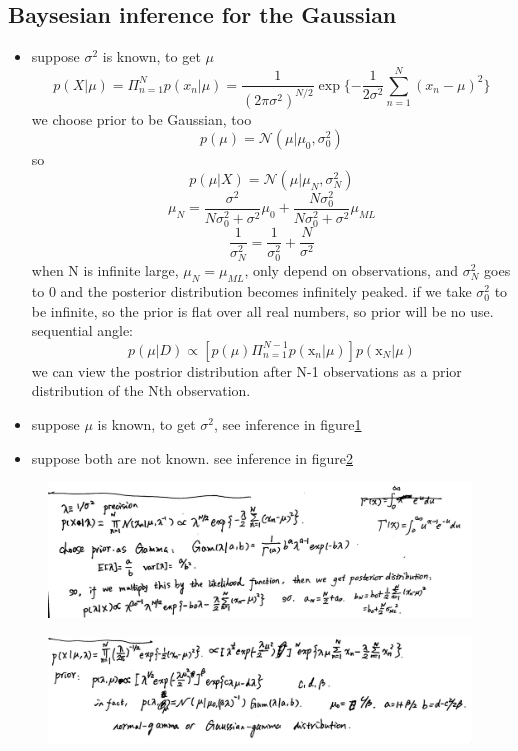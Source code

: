 \documentclass[a4paper]{book}
\begin{document}
\subsection{Baysesian inference for the Gaussian}
\begin{itemize}
  \item suppose $\sigma^2$ is known, to get $\mu$
  $$p(X|\mu) = \Pi_{n=1}^Np(x_n|\mu) = \frac1{(2\pi\sigma^2)^{N/2}}\exp\{-\frac1{2\sigma^2}\sum_{n=1}^N(x_n-\mu)^2\}$$
  we choose prior to be Gaussian, too
  $$p(\mu)= \mathcal N(\mu|\mu_0,\sigma_0^2) $$
so $$p(\mu|X) = \mathcal N(\mu|\mu_N,\sigma_N^2)$$
$$\mu_N  = \frac{\sigma^2}{N\sigma_0^2+\sigma^2}\mu_0+\frac{N\sigma_0^2}{N\sigma_0^2+\sigma^2}\mu_{ML}$$
$$\frac1{\sigma_N^2} = \frac1{\sigma_0^2}+\frac N{\sigma^2}$$
when N is infinite large, $\mu_N = \mu_{ML}$, only depend on observations, and $\sigma_N^2$ goes to 0 and the posterior distribution becomes infinitely peaked.\newline
if we take $\sigma_0^2$ to be infinite, so the prior is flat over all real numbers, so prior will be no use.\newline
sequential angle:
$$p(\mu|D)\propto [p(\mu)\Pi_{n=1}^{N-1}p(\mathrm x_n|\mu)]p(\mathrm x_N|\mu)$$
we can view the postrior distribution after N-1 observations as a prior distribution of the Nth observation.
  \item suppose $\mu$ is known, to get $\sigma^2$, see inference in figure\ref{fig1.2}
  \item suppose both are not known. see inference in figure\ref{fig1.3}
\end{itemize}
\begin{figure}
  \centering
  \includegraphics[width=\textwidth]{./imgs/GD2.jpg}
  \label{fig1.2}
\end{figure}
\begin{figure}
  \centering
  \includegraphics[width=\textwidth]{./imgs/GD3.jpg}
 \label{fig1.3}
\end{figure}
\end{document}
